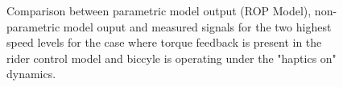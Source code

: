  \begin{figure}
    \centering
    \begin{subfigure}[b]{\textwidth}
        \centering
        \caption{}
        \label{fig:ropm_fit3}
    \end{subfigure}
    \begin{subfigure}[b]{\textwidth}
        \centering
        \caption{}
        \label{fig:ropm_fit4}
    \end{subfigure}
    
    \caption{Comparison between parametric model output (ROP Model), non-parametric model ouput and  measured signals for the two highest speed levels for the case where torque feedback is present in the rider control model and biccyle is operating under the "haptics on" dynamics.}
    \label{fig:ropm_fitB}
 \end{figure}


